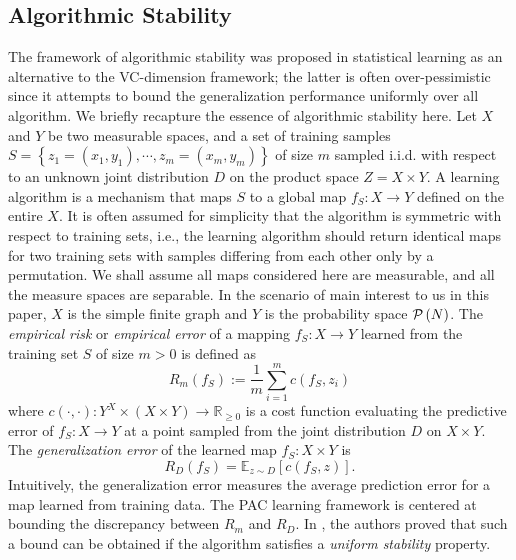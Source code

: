 \documentclass[letterpaper]{article} %
\begin{document}
\subsection{Algorithmic Stability}  
The framework of algorithmic stability \cite{DW1979,Algorithmic_Stability,MNPR2006} was proposed in statistical learning as an alternative to the VC-dimension framework; the latter is often over-pessimistic since it attempts to bound the generalization performance uniformly over all algorithm. We briefly recapture the essence of algorithmic stability here. Let $X$ and $Y$ be two measurable spaces, and a set of training samples $S=\left\{ z_1=\left( x_1,y_1 \right),\cdots,z_m= \left( x_m, y_m \right) \right\}$ of size $m$ sampled i.i.d. with respect to an unknown joint distribution $D$ on the product space $Z=X\times Y$. A learning algorithm is a mechanism that maps $S$ to a global map $f_S:X\rightarrow Y$ defined on the entire $X$. It is often assumed for simplicity that the algorithm is symmetric with respect to training sets, i.e., the learning algorithm should return identical maps for two training sets with samples differing from each other only by a permutation. We shall assume all maps considered here are measurable, and all the measure spaces are separable. In the scenario of main interest to us in this paper, $X$ is the simple finite graph and $Y$ is the probability space $\P\left( N \right)$. The \emph{empirical risk} or \emph{empirical error} of a mapping $f_S:X\rightarrow Y$ learned from the training set $S$ of size $m>0$ is defined as
\begin{equation*}
  R_m \left( f_S \right):=\frac{1}{m}\sum_{i=1}^mc \left( f_S, z_i \right)
\end{equation*}
where $c \left( \cdot,\cdot \right):Y^X\times \left( X\times Y \right)\rightarrow\mathbb{R}_{\geq0}$ is a cost function evaluating the predictive error of $f_S:X\rightarrow Y$ at a point sampled from the joint distribution $D$ on $X\times Y$. The \emph{generalization error} of the learned map $f_S:X\times Y$ is
\begin{equation*}
  R_D \left( f_S \right)=\mathbb{E}_{z\sim D} \left[ c \left( f_S,z \right) \right].
\end{equation*}
Intuitively, the generalization error measures the average prediction error for a map learned from  training data. The PAC learning framework is centered at bounding the discrepancy between $R_m$ and $R_D$. In \cite{Algorithmic_Stability}, the authors proved that such a bound can be obtained if the algorithm satisfies a \emph{uniform stability} property. 
\end{document}
